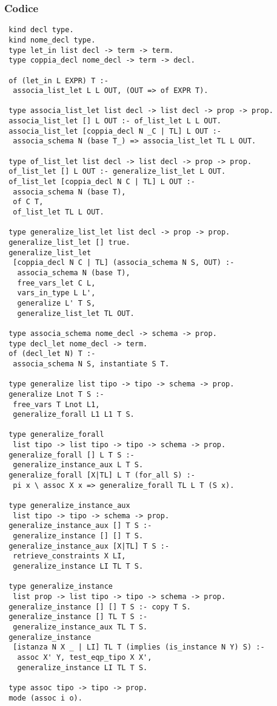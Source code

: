 \documentclass[12pt,a4paper,openright,twoside]{report}
\begin{document}
\subsubsection{Codice}
\begin{verbatim}
 kind decl type.
 kind nome_decl type.
 type let_in list decl -> term -> term.
 type coppia_decl nome_decl -> term -> decl.
 
 of (let_in L EXPR) T :-
  associa_list_let L L OUT, (OUT => of EXPR T).

 type associa_list_let list decl -> list decl -> prop -> prop.
 associa_list_let [] L OUT :- of_list_let L L OUT.
 associa_list_let [coppia_decl N _C | TL] L OUT :-
  associa_schema N (base T_) => associa_list_let TL L OUT.

 type of_list_let list decl -> list decl -> prop -> prop.
 of_list_let [] L OUT :- generalize_list_let L OUT.
 of_list_let [coppia_decl N C | TL] L OUT :-
  associa_schema N (base T),
  of C T,
  of_list_let TL L OUT.

 type generalize_list_let list decl -> prop -> prop.
 generalize_list_let [] true.
 generalize_list_let
  [coppia_decl N C | TL] (associa_schema N S, OUT) :-
   associa_schema N (base T),
   free_vars_let C L,
   vars_in_type L L',
   generalize L' T S,
   generalize_list_let TL OUT.

 type associa_schema nome_decl -> schema -> prop.
 type decl_let nome_decl -> term.
 of (decl_let N) T :-
  associa_schema N S, instantiate S T.

 type generalize list tipo -> tipo -> schema -> prop.
 generalize Lnot T S :-
  free_vars T Lnot L1,
  generalize_forall L1 L1 T S.

 type generalize_forall
  list tipo -> list tipo -> tipo -> schema -> prop.
 generalize_forall [] L T S :-
  generalize_instance_aux L T S.
 generalize_forall [X|TL] L T (for_all S) :-
  pi x \ assoc X x => generalize_forall TL L T (S x).

 type generalize_instance_aux
  list tipo -> tipo -> schema -> prop.
 generalize_instance_aux [] T S :-
  generalize_instance [] [] T S.
 generalize_instance_aux [X|TL] T S :-
  retrieve_constraints X LI,
  generalize_instance LI TL T S.

 type generalize_instance
  list prop -> list tipo -> tipo -> schema -> prop.
 generalize_instance [] [] T S :- copy T S.
 generalize_instance [] TL T S :-
  generalize_instance_aux TL T S.
 generalize_instance
  [istanza N X _ | LI] TL T (implies (is_instance N Y) S) :-
   assoc X' Y, test_eqp_tipo X X',
   generalize_instance LI TL T S.

 type assoc tipo -> tipo -> prop.
 mode (assoc i o).
\end{verbatim}
\end{document}
